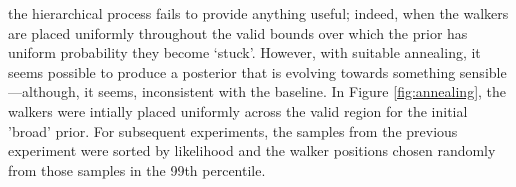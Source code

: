 \documentclass{tufte-handout}
\begin{document}
 the hierarchical process fails to
provide anything useful; indeed, when the walkers are placed uniformly
throughout the valid bounds over which the prior has uniform
probability they become `stuck'. However, with suitable annealing, it
seems possible to produce a posterior that is evolving towards
something sensible---although, it seems, inconsistent with the
baseline. In Figure \ref{fig:annealing}, the walkers were intially
placed uniformly across the valid region for the initial 'broad'
prior. For subsequent experiments, the samples from the previous
experiment were sorted by likelihood and the walker positions chosen
randomly from those samples in the 99th percentile.  
\end{document}
